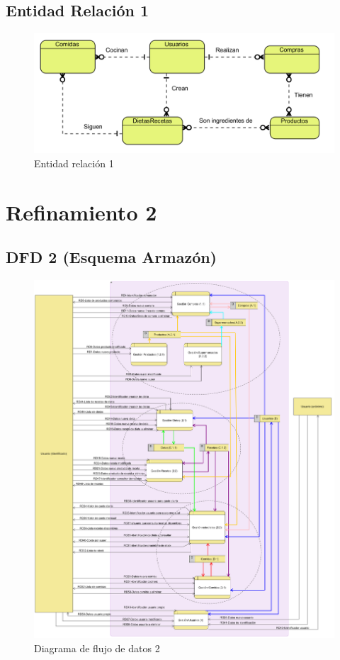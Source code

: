 \documentclass[a4paper,12pt]{report}
\begin{document}
\section{Entidad Relación 1}
\label{sec-5-3}
\begin{figure}[!htp]
\centering
\includegraphics[width=0.7\linewidth]{./refinamientos/er1.png}
\caption{Entidad relación 1}
\label{fig:Entidad relación 1}
\medskip
\footnotesize
{}
\end{figure}
\chapter{Refinamiento 2}
\label{sec-6}
\section{DFD 2 (Esquema Armazón)}
\label{sec-6-1}
\begin{figure}[!htp]
\centering
\includegraphics[width=0.95\linewidth]{./refinamientos/dfd2.png}
\caption{Diagrama de flujo de datos 2}
\label{fig:Diagrama de flujo de datos 2}
\medskip
\footnotesize
{}
\end{figure}
\end{document}
